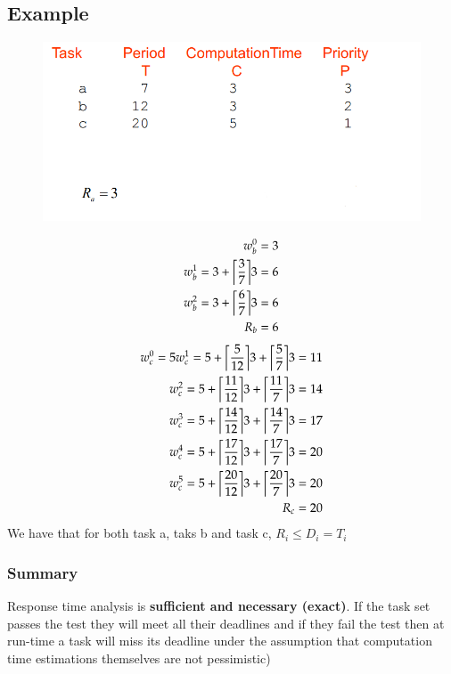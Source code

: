 \subsection{Example}
\begin{figure}[H]
\centering
\includegraphics[width=0.9\linewidth]{figures/Scheduling/Response Time Analysis/example.PNG}
\end{figure}
\begin{align}
    w_b^0 = 3 \\
    w_b^1 = 3 + \ceil*{\frac{3}{7}}3 = 6 \\
    w_b^2 = 3 + \ceil*{\frac{6}{7}}3 = 6\\
    R_b = 6
\end{align}
\begin{align}
w_c^0 = 5
w_c^1 = 5 + \ceil*{\frac{5}{12}}3 + \ceil*{\frac{5}{7}}3 = 11 \\
w_c^2 = 5 + \ceil*{\frac{11}{12}}3 + \ceil*{\frac{11}{7}}3 = 14 \\
w_c^3 = 5 + \ceil*{\frac{14}{12}}3 + \ceil*{\frac{14}{7}}3 = 17 \\
w_c^4 = 5 + \ceil*{\frac{17}{12}}3 + \ceil*{\frac{17}{7}}3 = 20 \\
w_c^5 = 5 + \ceil*{\frac{20}{12}}3 + \ceil*{\frac{20}{7}}3 = 20 \\
R_c = 20
\end{align}
We have that for both task a, taks b and task c, $R_i\leq D_i=T_i$ 

\subsubsection{Summary}
Response time analysis is \textbf{sufficient and necessary (exact)}. If the task set passes the test they will meet all their deadlines and if they fail the test then at run-time a task will miss its deadline under the assumption that computation time estimations themselves are not pessimistic)

